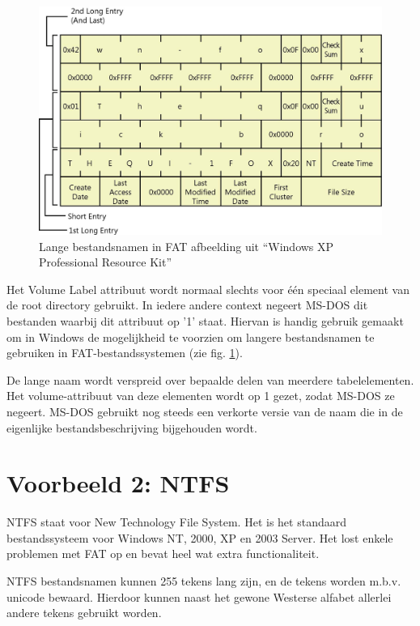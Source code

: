 \begin{figure}
\begin{center}
\includegraphics[width=\textwidth]{images/fig0415.jpg}
\caption{Lange bestandsnamen in FAT \tiny{afbeelding uit ``Windows XP Professional Resource Kit''}}
\label{fatlangnaam}
\end{center}
\end{figure}


Het Volume Label attribuut wordt normaal slechts voor \'e\'en
speciaal element van de root directory gebruikt. In iedere andere
context negeert MS-DOS dit bestanden waarbij dit attribuut op '1'
staat. Hiervan is handig gebruik gemaakt om in Windows de mogelijkheid
te voorzien om langere bestandsnamen te gebruiken in
FAT-bestandssystemen (zie fig. \ref{fatlangnaam}).

De lange naam wordt verspreid over bepaalde delen van meerdere
tabelelementen. Het volume-attribuut van deze elementen wordt op 1
gezet, zodat MS-DOS ze negeert. MS-DOS gebruikt nog steeds een
verkorte versie van de naam die in de eigenlijke bestandsbeschrijving
bijgehouden wordt.

\section{Voorbeeld 2: NTFS}

NTFS staat voor New Technology File System. Het is het standaard
bestandssysteem voor Windows NT, 2000, XP en 2003 Server. Het lost
enkele problemen met FAT op en bevat heel wat extra
functionaliteit.

NTFS bestandsnamen kunnen 255 tekens lang zijn, en de tekens
worden m.b.v. unicode bewaard. Hierdoor kunnen naast het gewone Westerse
alfabet allerlei andere tekens gebruikt worden.


